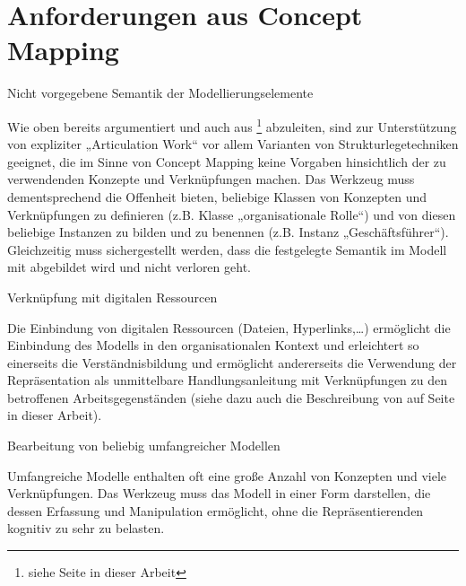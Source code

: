 \section{Anforderungen aus Concept Mapping} %
\label{sec:anforderungen_aus_concept_mapping}

\begin{anf}
	\label{anf:nicht_vorgegebene_semantik_der_modellierungselemente}
	Nicht vorgegebene Semantik der Modellierungselemente
\end{anf}

Wie oben bereits argumentiert und auch aus \citet{Seel91}\footnote{siehe Seite \pageref{anforderungen_seel} in dieser Arbeit} abzuleiten, sind zur Unterstützung von expliziter „Articulation Work“ vor allem Varianten von Strukturlegetechniken geeignet, die im Sinne von Concept Mapping keine Vorgaben hinsichtlich der zu verwendenden Konzepte und Verknüpfungen machen. Das Werkzeug muss dementsprechend die Offenheit bieten, beliebige Klassen von Konzepten und Verknüpfungen zu definieren (z.B. Klasse „organisationale Rolle“) und von diesen beliebige Instanzen zu bilden und zu benennen (z.B. Instanz „Geschäftsführer“). Gleichzeitig muss sichergestellt werden, dass die festgelegte Semantik im Modell mit abgebildet wird und nicht verloren geht.


\begin{anf}
	\label{anf:verknüpfung_mit_digitalen_ressourcen}
	Verknüpfung mit digitalen Ressourcen
\end{anf}

Die Einbindung von digitalen Ressourcen (Dateien, Hyperlinks,\ldots) ermöglicht die Einbindung des Modells in den organisationalen Kontext und erleichtert so einerseits die Verständnisbildung und ermöglicht andererseits die Verwendung der Repräsentation als unmittelbare Handlungsanleitung mit Verknüpfungen zu den betroffenen Arbeitsgegenständen (siehe dazu auch die Beschreibung von \citep{Jorgensen04} auf Seite \pageref{steps:jorgensen} in dieser Arbeit).


\begin{anf}
	\label{anf:bearbeitung_von_beliebig_komplexen_modellen}
	Bearbeitung von beliebig umfangreicher Modellen
\end{anf}

Umfangreiche Modelle enthalten oft eine große Anzahl von Konzepten und viele Verknüpfungen. Das Werkzeug muss das Modell in einer Form darstellen, die dessen Erfassung und Manipulation ermöglicht, ohne die Repräsentierenden kognitiv zu sehr zu belasten.

